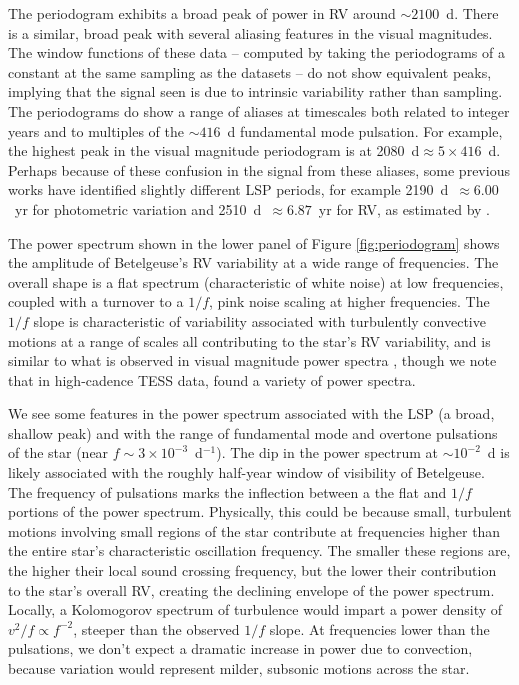 \documentclass[twocolumn]{aastex631}
\begin{document}
The periodogram exhibits a broad peak of power in RV around $\sim 2100$~d. There is a similar, broad peak with several aliasing features in the visual magnitudes.  The window functions of these data -- computed by taking the periodograms of a constant at the same sampling as the datasets -- do not show equivalent peaks, implying that the signal seen is due to intrinsic variability rather than sampling. The periodograms do show a range of aliases at timescales both related to integer years and to multiples of the $\sim 416$~d fundamental mode pulsation. For example, the highest peak in the visual magnitude periodogram is at 2080~d$\approx 5\times 416$~d. Perhaps because of these confusion in the signal from these aliases, some previous works have identified slightly different LSP periods, for example 2190~d~$\approx6.00$~yr for photometric variation and 2510~d~$\approx 6.87$~yr for RV, as estimated by \citet{2023NewA...9901962J}. 

The power spectrum shown in the lower panel of Figure \ref{fig:periodogram} shows the amplitude of Betelgeuse's RV variability at a wide range of frequencies. The overall shape is a flat spectrum (characteristic of white noise) at low frequencies, coupled with a turnover to a $1/f$, pink noise scaling at higher frequencies. The $1/f$ slope is characteristic of variability associated with turbulently convective motions at a range of scales all contributing to the star's RV variability, and is similar to what is observed in visual magnitude power spectra \citep{2006MNRAS.372.1721K,2020ApJ...902...63J}, though we note that in high-cadence TESS data, \citet{2019ApJ...878..155D} found a variety of power spectra. 

We see some features in the power spectrum associated with the LSP (a broad, shallow peak) and with the range of fundamental mode and overtone pulsations of the star (near $f\sim 3\times 10^{-3}$~d$^{-1}$). The dip in the power spectrum at $\sim 10^{-2}$~d is likely associated with the roughly half-year window of visibility of Betelgeuse. The frequency of pulsations marks the inflection between a the flat and $1/f$ portions of the power spectrum. Physically, this could be because small, turbulent motions involving small regions of the star contribute at frequencies higher than the entire star's characteristic oscillation frequency. The smaller these regions are, the higher their local sound crossing frequency, but the lower their contribution to the star's overall RV, creating the declining envelope of the power spectrum.  Locally, a Kolomogorov spectrum of turbulence would impart a power density of $v^2/f \propto f^{-2}$, steeper than the observed $1/f$ slope.  At frequencies lower than the pulsations, we don't expect a dramatic increase in power due to convection, because variation would represent milder, subsonic motions across the star. 
\end{document}
